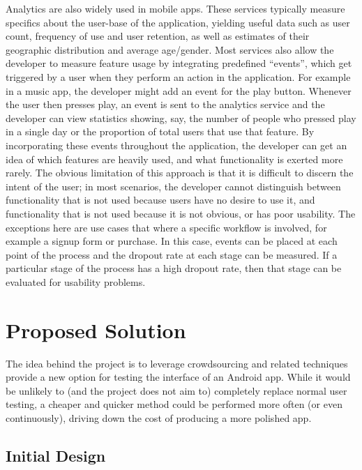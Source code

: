 Analytics are also widely used in mobile apps.
These services typically measure specifics about the user-base of
the application, yielding useful data such as user count, frequency of use and
user retention, as well as estimates of their geographic distribution and
average age/gender. Most services also allow the developer to measure feature
usage by integrating predefined ``events'', which get triggered by a user when they perform
an action in the application. For example in a music app, the developer
might add an event for the play button. Whenever the user then presses play, an
event is sent to the analytics service and the developer can view statistics
showing, say, the number of people who pressed play in a single day or the
proportion of total users that use that feature. By incorporating these events
throughout the application, the developer can get an idea of which features are
heavily used, and what functionality is exerted more rarely. The obvious
limitation of this approach is that it is difficult to discern the intent of
the user; in most scenarios, the developer cannot distinguish between
functionality that is not used because users have no desire to use it, and
functionality that is not used because it is not obvious, or has poor
usability. The exceptions here are use cases that where a specific workflow is
involved, for example a signup form or purchase. In this case, events can
be placed at each point of the process and the dropout rate at each stage can
be measured. If a particular stage of the process has a high dropout rate, then
that stage can be evaluated for usability problems.

\section{Proposed Solution}

The idea behind the project is to leverage crowdsourcing and related techniques
provide a new option for testing the interface of an Android app. While it
would be unlikely to (and the project does not aim to) completely replace
normal user testing, a cheaper and quicker method could be performed more often
(or even continuously), driving down the cost of producing a more polished app.


\subsection{Initial Design}


